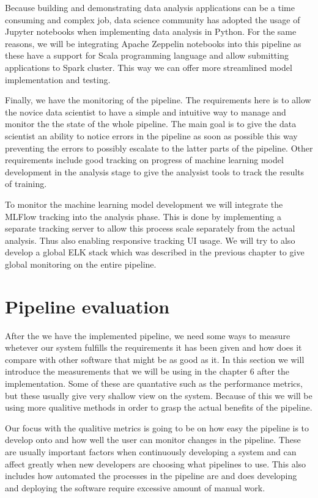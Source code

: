 Because building and demonstrating data analysis applications can be a time consuming and complex job, data science community has adopted the usage of Jupyter notebooks when implementing data analysis in Python.
For the same reasons, we will be integrating Apache Zeppelin notebooks into this pipeline as these have a support for Scala programming language and allow submitting applications to Spark cluster.
This way we can offer more streamlined model implementation and testing.

Finally, we have the monitoring of the pipeline.
The requirements here is to allow the novice data scientist to have a simple and intuitive way to manage and monitor the the state of the whole pipeline.
The main goal is to give the data scientist an ability to notice errors in the pipeline as soon as possible this way preventing the errors to possibly escalate to the latter parts of the pipeline.
Other requirements include good tracking on progress of machine learning model development in the analysis stage to give the analysist tools to track the results of training.

To monitor the machine learning model development we will integrate the MLFlow tracking into the analysis phase.
This is done by implementing a separate tracking server to allow this process scale separately from the actual analysis.
Thus also enabling responsive tracking UI usage.
We will try to also develop a global ELK stack which was described in the previous chapter to give global monitoring on the entire pipeline.

\section{Pipeline evaluation}

After the we have the implemented pipeline, we need some ways to measure whetever our system fulfills the requirements it has been given and how does it compare with other software that might be as good as it.
In this section we will introduce the measurements that we will be using in the chapter 6 after the implementation.
Some of these are quantative such as the performance metrics, but these usually give very shallow view on the system.
Because of this we will be using more qualitive methods in order to grasp the actual benefits of the pipeline.

Our focus with the qualitive metrics is going to be on how easy the pipeline is to develop onto and how well the user can monitor changes in the pipeline.
These are usually important factors when continuously developing a system and can affect greatly when new developers are choosing what pipelines to use.
This also includes how automated the processes in the pipeline are and does developing and deploying the software require excessive amount of manual work.

